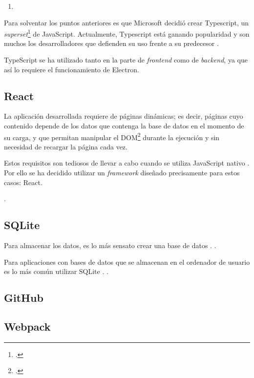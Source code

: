 \begin{enumerate}
	\item 
\end{enumerate}

Para solventar los puntos anteriores es que Microsoft decidió crear Typescript, un \textit{superset}\footnote{.} de JavaScript. Actualmente, Typescript está ganando popularidad y son muchos los desarrolladores que defienden su uso frente a su predecesor \autocite{Typescript}.

TypeScript se ha utilizado tanto en la parte de \textit{frontend} como de \textit{backend}, ya que así lo requiere el funcionamiento de Electron.

\subsection{React}

La aplicación desarrollada requiere de páginas dinámicas; es decir, páginas cuyo contenido depende de los datos que contenga la base de datos en el momento de su carga, y que permitan manipular el DOM\footnote{.} durante la ejecución y sin necesidad de recargar la página cada vez.

Estos requisitos son tediosos de llevar a cabo cuando se utiliza JavaScript nativo \citationNeeded. Por ello se ha decidido utilizar un \textit{framework} diseñado precisamente para estos casos: React.

.

\subsection{SQLite}

Para almacenar los datos, es lo más sensato crear una base de datos \citationNeeded. .

Para aplicaciones con bases de datos que se almacenan en el ordenador de usuario es lo más común utilizar SQLite \citationNeeded. .

\subsection{GitHub}

\subsection{Webpack}

